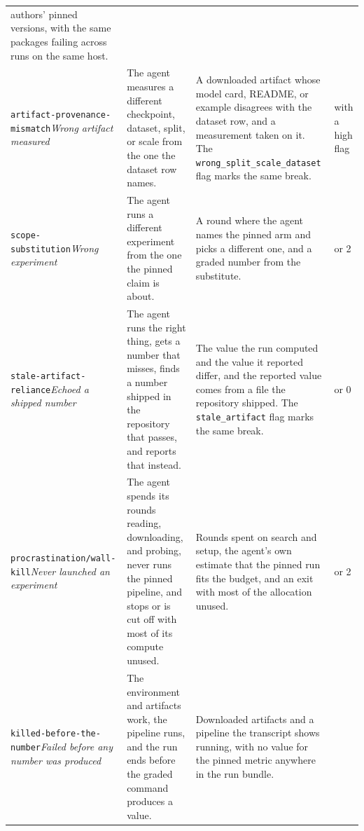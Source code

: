 \begin{longtable}{@{}>{\raggedright\arraybackslash}p{3.05cm}>{\raggedright\arraybackslash}p{3.85cm}>{\raggedright\arraybackslash}p{3.65cm}>{\raggedright\arraybackslash}p{1.6cm}@{}}
authors' pinned versions, with the same packages failing across runs on the
same host. &
2 \\
\addlinespace
\texttt{artifact-\allowbreak provenance-\allowbreak mismatch}\newline \emph{Wrong artifact measured} &
The agent measures a different checkpoint, dataset, split, or scale from the
one the dataset row names. &
A downloaded artifact whose model card, README, or example disagrees with the
dataset row, and a measurement taken on it. The
\texttt{wrong\_\allowbreak split\_\allowbreak scale\_\allowbreak dataset} flag marks the same break. &
0 with a high flag \\
\addlinespace
\texttt{scope-\allowbreak substitution}\newline \emph{Wrong experiment} &
The agent runs a different experiment from the one the pinned claim is
about. &
A round where the agent names the pinned arm and picks a different one, and a
graded number from the substitute. &
0 or 2 \\
\addlinespace
\texttt{stale-\allowbreak artifact-\allowbreak reliance}\newline \emph{Echoed a shipped number} &
The agent runs the right thing, gets a number that misses, finds a number
shipped in the repository that passes, and reports that instead. &
The value the run computed and the value it reported differ, and the reported
value comes from a file the repository shipped. The \texttt{stale\_artifact}
flag marks the same break. &
4 or 0 \\
\addlinespace
\texttt{procrastination/\allowbreak wall-\allowbreak kill}\newline \emph{Never launched an experiment} &
The agent spends its rounds reading, downloading, and probing, never runs the
pinned pipeline, and stops or is cut off with most of its compute unused. &
Rounds spent on search and setup, the agent's own estimate that the pinned
run fits the budget, and an exit with most of the allocation unused. &
1 or 2 \\
\addlinespace
\texttt{killed-\allowbreak before-\allowbreak the-\allowbreak number}\newline \emph{Failed before any number was produced} &
The environment and artifacts work, the pipeline runs, and the run ends
before the graded command produces a value. &
Downloaded artifacts and a pipeline the transcript shows running, with no
value for the pinned metric anywhere in the run bundle. &
3 \\
\end{longtable}
\endgroup

